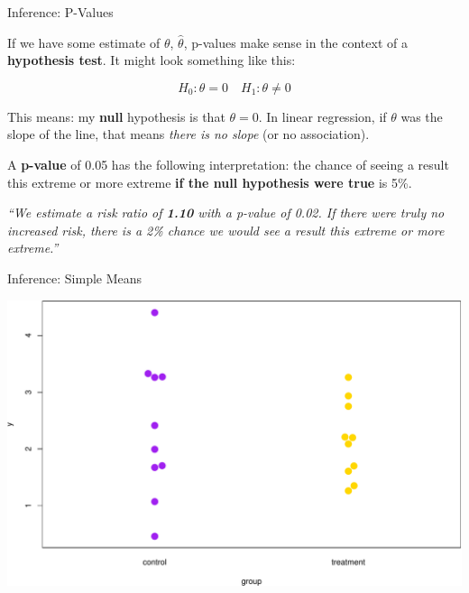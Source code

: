 \documentclass[ignorenonframetext,]{beamer}
\begin{document}
\begin{frame}{Inference: P-Values}
\protect\hypertarget{inference-p-values}{}

If we have some estimate of \(\theta\), \(\hat{\theta}\), p-values make
sense in the context of a \textbf{hypothesis test}. It might look
something like this:

\[
H_0: \theta = 0 \quad H_1: \theta \neq 0
\]

This means: my \textbf{null} hypothesis is that \(\theta = 0\). In
linear regression, if \(\theta\) was the slope of the line, that means
\emph{there is no slope} (or no association).

A \textbf{p-value} of 0.05 has the following interpretation: the chance
of seeing a result this extreme or more extreme \textbf{if the null
hypothesis were true} is 5\%.

\emph{``We estimate a risk ratio of \textbf{1.10} with a p-value of
0.02. If there were truly no increased risk, there is a 2\% chance we
would see a result this extreme or more extreme.''}

\end{frame}

\begin{frame}{Inference: Simple Means}
\protect\hypertarget{inference-simple-means}{}

\includegraphics{biostats_I_files/figure-beamer/unnamed-chunk-3-1.pdf}

\end{frame}
\end{document}
